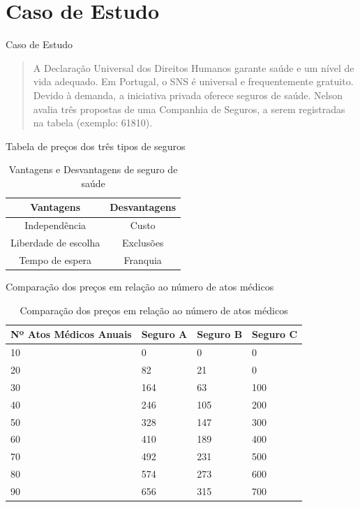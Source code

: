 \documentclass[10pt]{beamer}
\begin{document}
\section{Caso de Estudo}
\begin{frame}{Caso de Estudo}
    \begin{quote}
        A Declaração Universal dos Direitos Humanos garante saúde e um nível de vida adequado. Em Portugal, o SNS é universal e frequentemente gratuito. Devido à demanda, a iniciativa privada oferece seguros de saúde. Nelson avalia três propostas de uma Companhia de Seguros, a serem registradas na tabela (exemplo: 61810).
    \end{quote}
\end{frame}

\begin{frame}{Tabela de preços dos três tipos de seguros}
    \begin{table}
        \centering
        \begin{tabular}{|c|c|}
            \hline
            \textbf{Vantagens} & \textbf{Desvantagens} \\
            \hline
            Independência & Custo \\
            \hline
            Liberdade de escolha & Exclusões \\
            \hline
            Tempo de espera & Franquia \\
            \hline
        \end{tabular}
        \caption{Vantagens e Desvantagens de seguro de saúde}
    \end{table}
\end{frame}

\begin{frame}{Comparação dos preços em relação ao número de atos médicos}
    \begin{table}
        \centering
        \begin{tabular}{|l|l|l|l|}
            \hline
            Nº Atos Médicos Anuais & Seguro A & Seguro B & Seguro C \\
            \hline
            10 & 0 & 0 & 0 \\
            20 & 82 & 21 & 0 \\
            30 & 164 & 63 & 100 \\
            40 & 246 & 105 & 200 \\
            50 & 328 & 147 & 300 \\
            60 & 410 & 189 & 400 \\
            70 & 492 & 231 & 500 \\
            80 & 574 & 273 & 600 \\
            90 & 656 & 315 & 700 \\
            \hline
        \end{tabular}
        \caption{Comparação dos preços em relação ao número de atos médicos}
    \end{table}
\end{frame}
\end{document}
